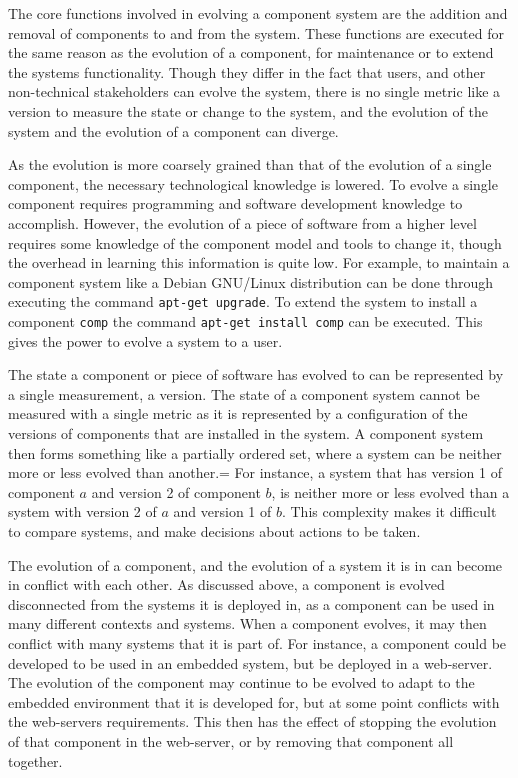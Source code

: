 The core functions involved in evolving a component system are the addition and removal of components to and from the system.
These functions are executed for the same reason as the evolution of a component, for maintenance or to extend the systems functionality.
Though they differ in the fact that users, and other non-technical stakeholders can evolve the system,
there is no single metric like a version to measure the state or change to the system,
and the evolution of the system and the evolution of a component can diverge.
 
As the evolution is more coarsely grained than that of the evolution of a single component, the necessary technological knowledge is lowered.
To evolve a single component requires programming and software development knowledge to accomplish.
However, the evolution of a piece of software from a higher level requires some knowledge of the component model and tools to change it,
though the overhead in learning this information is quite low.
For example, to maintain a component system like a Debian GNU/Linux distribution can be done through executing the command \verb+apt-get upgrade+.
To extend the system to install a component \verb+comp+ the command \verb+apt-get install comp+ can be executed.
This gives the power to evolve a system to a user.

The state a component or piece of software has evolved to can be represented by a single measurement, a version.
The state of a component system cannot be measured with a single metric as it is represented by a configuration of the versions of components that are installed in the system.
A component system then forms something like a partially ordered set, where a system can be neither more or less evolved than another.=
For instance, a system that has version 1 of component $a$ and version 2 of component $b$, is neither more or less evolved than a system with version 2 of $a$ and version 1 of $b$.
This complexity makes it difficult to compare systems, and make decisions about actions to be taken.

The evolution of a component, and the evolution of a system it is in can become in conflict with each other.
As discussed above, a component is evolved disconnected from the systems it is deployed in, as a component can be used in many different contexts and systems.
When a component evolves, it may then conflict with many systems that it is part of.
For instance, a component could be developed to be used in an embedded system, but be deployed in a web-server.
The evolution of the component may continue to be evolved to adapt to the embedded environment that it is developed for,
but at some point conflicts with the web-servers requirements.
This then has the effect of stopping the evolution of that component in the web-server, or by removing that component all together.

